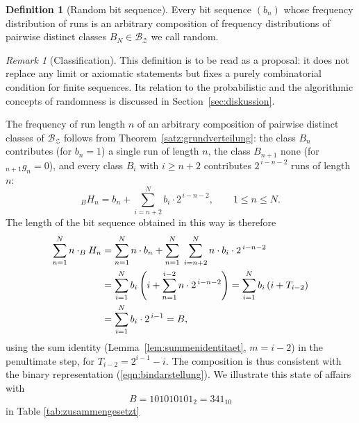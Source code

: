 \documentclass[11pt,a4paper]{scrartcl}
\theoremstyle{plain}
\theoremstyle{definition}
\newtheorem{defi}[satz]{Definition}
\theoremstyle{remark}
\newtheorem{bem}[satz]{Remark}
\begin{document}
\begin{defi}[Random bit sequence]\label{defi:zufaellig}
Every bit sequence $(b_n)$ whose frequency distribution of runs is an
arbitrary composition of frequency distributions of pairwise distinct
classes $B_N \in \mathcal{B_Z}$ we call random.
\end{defi}
\begin{bem}[Classification]\label{bem:einordnung}
This definition is to be read as a proposal: it does not replace any
limit or axiomatic statements but fixes a purely combinatorial
condition for finite sequences. Its relation to the probabilistic
and the algorithmic concepts of randomness is discussed in
Section~\ref{sec:diskussion}.
\end{bem}

The frequency of run length $n$ of an arbitrary composition of
pairwise distinct classes of $\mathcal{B_Z}$ follows from
Theorem~\ref{satz:grundverteilung}: the class $B_n$ contributes (for
$b_n=1$) a single run of length $n$, the class $B_{n+1}$ none (for
$_{n+1}g_n=0$), and every class $B_i$ with $i\geq n+2$ contributes
$2^{\,i-n-2}$ runs of length $n$:
\begin{equation}\label{eqn:hnformel}
  _BH_n=b_n+\sum_{i=n+2}^{N} b_{i}\cdot 2^{\,i-n-2},\qquad 1\leq n\leq N.
\end{equation}
The length of the bit sequence obtained in this way is therefore
\begin{align}
  \sum_{n=1}^{N} n\cdot _BH_n
  &= \sum_{n=1}^{N} n\cdot b_n+\sum_{n=1}^{N}\;\sum_{i=n+2}^{N}
     n\cdot b_{i}\cdot 2^{\,i-n-2}\notag\\
  &= \sum_{i=1}^{N} b_i\left(i+\sum_{n=1}^{i-2} n\cdot 2^{\,i-n-2}\right)
   = \sum_{i=1}^{N} b_i\left(i+T_{i-2}\right)\notag\\
  &= \sum_{i=1}^{N} b_i\cdot 2^{\,i-1}=B,\label{eqn:laengekonsistenz}
\end{align}
using the sum identity (Lemma~\ref{lem:summenidentitaet},
$m=i-2$) in the penultimate step, for $T_{i-2}=2^{i-1}-i$. The
composition is thus consistent with the binary representation
(\ref{eqn:bindarstellung}). We illustrate this state of affairs with
\begin{equation}
  B=101010101_2=341_{10}
\end{equation}
in Table \ref{tab:zusammengesetzt}
\end{document}
